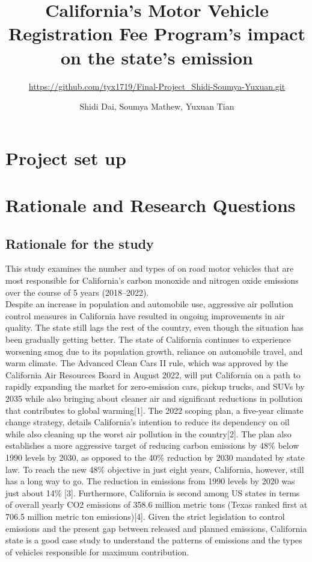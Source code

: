 \documentclass[
  12pt,
]{article}
\title{California's Motor Vehicle Registration Fee Program's impact on
the state's emission}
\subtitle{\url{https://github.com/tyx1719/Final-Project_Shidi-Soumya-Yuxuan.git}}
\author{Shidi Dai, Soumya Mathew, Yuxuan Tian}
\date{}
\begin{document}
\maketitle

\newpage
\tableofcontents 
\newpage
\listoftables 
\newpage
\listoffigures 
\newpage

\hypertarget{project-set-up}{%
\section{Project set up}\label{project-set-up}}

\hypertarget{rationale-and-research-questions}{%
\section{Rationale and Research
Questions}\label{rationale-and-research-questions}}

\hypertarget{rationale-for-the-study}{%
\subsection{Rationale for the study}\label{rationale-for-the-study}}

This study examines the number and types of on road motor vehicles that
are most responsible for California's carbon monoxide and nitrogen oxide
emissions over the course of 5 years (2018--2022).\\
Despite an increase in population and automobile use, aggressive air
pollution control measures in California have resulted in ongoing
improvements in air quality. The state still lags the rest of the
country, even though the situation has been gradually getting better.
The state of California continues to experience worsening smog due to
its population growth, reliance on automobile travel, and warm climate.
The Advanced Clean Cars II rule, which was approved by the California
Air Resources Board in August 2022, will put California on a path to
rapidly expanding the market for zero-emission cars, pickup trucks, and
SUVs by 2035 while also bringing about cleaner air and significant
reductions in pollution that contributes to global warming{[}1{]}. The
2022 scoping plan, a five-year climate change strategy, details
California's intention to reduce its dependency on oil while also
cleaning up the worst air pollution in the country{[}2{]}. The plan also
establishes a more aggressive target of reducing carbon emissions by
48\% below 1990 levels by 2030, as opposed to the 40\% reduction by 2030
mandated by state law. To reach the new 48\% objective in just eight
years, California, however, still has a long way to go. The reduction in
emissions from 1990 levels by 2020 was just about 14\% {[}3{]}.
Furthermore, California is second among US states in terms of overall
yearly CO2 emissions of 358.6 million metric tons (Texas ranked first at
706.5 million metric ton emissions){[}4{]}. Given the strict legislation
to control emissions and the present gap between released and planned
emissions, California state is a good case study to understand the
patterns of emissions and the types of vehicles responsible for maximum
contribution.
\end{document}
